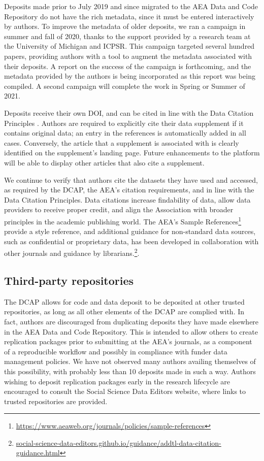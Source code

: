 \documentclass[PP]{AEA}
\newcommand{\aeadcr}{AEA Data and Code Repository}
\newcommand{\urlcite}[2]{#2\footnote{\url{#1}}}
\begin{document}
Deposits made prior to July 2019 and since migrated to the AEA Data and Code Repository do not have the rich metadata, since it must be entered interactively by authors. To improve the metadata of older deposits, we ran a campaign in summer and fall of 2020, thanks to the support provided by a research team at the University of Michigan and ICPSR. This campaign targeted several hundred papers, providing authors with a tool to augment the metadata associated with their deposits. A report on the success of the campaign is forthcoming, and the metadata provided by the authors is being incorporated as this report was being compiled. A second campaign will complete the work in Spring or Summer of 2021. 

Deposits receive their own \ac{DOI}, and can be cited in line with the Data Citation Principles \citep{Altman2013-fl,jddcp}. Authors are required to explicitly cite their data supplement if it contains original data; an entry in the references is automatically added in all cases. Conversely, the article that a supplement is associated with is clearly identified on the supplement's landing page. Future enhancements to the platform will be able to display other articles that also cite a supplement. 

We continue to verify that authors cite the datasets they have used and accessed, as required by the \ac{DCAP}, the AEA's citation requirements, and in line with the Data Citation Principles.  Data citations increase findability of data, allow data providers to receive proper credit, and align the Association with broader principles in the academic publishing world. The AEA's  \urlcite{https://www.aeaweb.org/journals/policies/sample-references}{Sample References} provide a style reference, and additional guidance for non-standard data sources, such as confidential or proprietary data, has been developed in collaboration with other journals and guidance by librarians.\footnote{\url{social-science-data-editors.github.io/guidance/addtl-data-citation-guidance.html}}.


\subsection{Third-party repositories}

The \ac{DCAP} allows for code and data deposit to be deposited at other trusted repositories, as long as all other elements of the \ac{DCAP} are complied with. In fact, authors are discouraged from duplicating deposits they have made elsewhere in the \aeadcr{}. This is intended to allow others to create replication packages prior to submitting at the AEA's journals, as a component of a reproducible workflow and possibly in compliance with funder data management policies. We have not observed many authors availing themselves of this possibility, with probably less than 10 deposits made in such a way. Authors wishing to deposit replication packages early in the research lifecycle are encouraged to consult the Social Science Data Editors website, where links to trusted repositories are provided.
	
\end{document}
